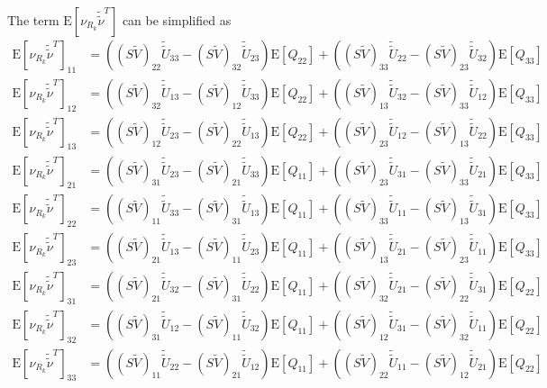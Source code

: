\documentclass[10pt]{article}
\newcommand{\expect}[1]{\ensuremath{\mathrm{E}\left[ #1 \right]}}
\begin{document}
The term $\expect{\nu_{R_k}\tilde{\tilde{\nu}}^T}$ can be simplified as
\begin{align*}
	\expect{\nu_{R_k}\tilde{\tilde{\nu}}^T}_{11} &= ((S\tilde{V})_{22}\tilde{\tilde{U}}_{33} - (S\tilde{V})_{32}\tilde{\tilde{U}}_{23})\expect{Q_{22}} + ((S\tilde{V})_{33}\tilde{\tilde{U}}_{22} - (S\tilde{V})_{23}\tilde{\tilde{U}}_{32})\expect{Q_{33}} \\
	\expect{\nu_{R_k}\tilde{\tilde{\nu}}^T}_{12} &= ((S\tilde{V})_{32}\tilde{\tilde{U}}_{13} - (S\tilde{V})_{12}\tilde{\tilde{U}}_{33})\expect{Q_{22}} + ((S\tilde{V})_{13}\tilde{\tilde{U}}_{32} - (S\tilde{V})_{33}\tilde{\tilde{U}}_{12})\expect{Q_{33}} \\
	\expect{\nu_{R_k}\tilde{\tilde{\nu}}^T}_{13} &= ((S\tilde{V})_{12}\tilde{\tilde{U}}_{23} - (S\tilde{V})_{22}\tilde{\tilde{U}}_{13})\expect{Q_{22}} + ((S\tilde{V})_{23}\tilde{\tilde{U}}_{12} - (S\tilde{V})_{13}\tilde{\tilde{U}}_{22})\expect{Q_{33}} \\
	\expect{\nu_{R_k}\tilde{\tilde{\nu}}^T}_{21} &= ((S\tilde{V})_{31}\tilde{\tilde{U}}_{23} - (S\tilde{V})_{21}\tilde{\tilde{U}}_{33})\expect{Q_{11}} + ((S\tilde{V})_{23}\tilde{\tilde{U}}_{31} - (S\tilde{V})_{33}\tilde{\tilde{U}}_{21})\expect{Q_{33}} \\
	\expect{\nu_{R_k}\tilde{\tilde{\nu}}^T}_{22} &= ((S\tilde{V})_{11}\tilde{\tilde{U}}_{33} - (S\tilde{V})_{31}\tilde{\tilde{U}}_{13})\expect{Q_{11}} + ((S\tilde{V})_{33}\tilde{\tilde{U}}_{11} - (S\tilde{V})_{13}\tilde{\tilde{U}}_{31})\expect{Q_{33}} \\
	\expect{\nu_{R_k}\tilde{\tilde{\nu}}^T}_{23} &= ((S\tilde{V})_{21}\tilde{\tilde{U}}_{13} - (S\tilde{V})_{11}\tilde{\tilde{U}}_{23})\expect{Q_{11}} + ((S\tilde{V})_{13}\tilde{\tilde{U}}_{21} - (S\tilde{V})_{23}\tilde{\tilde{U}}_{11})\expect{Q_{33}} \\
	\expect{\nu_{R_k}\tilde{\tilde{\nu}}^T}_{31} &= ((S\tilde{V})_{21}\tilde{\tilde{U}}_{32} - (S\tilde{V})_{31}\tilde{\tilde{U}}_{22})\expect{Q_{11}} + ((S\tilde{V})_{32}\tilde{\tilde{U}}_{21} - (S\tilde{V})_{22}\tilde{\tilde{U}}_{31})\expect{Q_{22}} \\
	\expect{\nu_{R_k}\tilde{\tilde{\nu}}^T}_{32} &= ((S\tilde{V})_{31}\tilde{\tilde{U}}_{12} - (S\tilde{V})_{11}\tilde{\tilde{U}}_{32})\expect{Q_{11}} + ((S\tilde{V})_{12}\tilde{\tilde{U}}_{31} - (S\tilde{V})_{32}\tilde{\tilde{U}}_{11})\expect{Q_{22}} \\
	\expect{\nu_{R_k}\tilde{\tilde{\nu}}^T}_{33} &= ((S\tilde{V})_{11}\tilde{\tilde{U}}_{22} - (S\tilde{V})_{21}\tilde{\tilde{U}}_{12})\expect{Q_{11}} + ((S\tilde{V})_{22}\tilde{\tilde{U}}_{11} - (S\tilde{V})_{12}\tilde{\tilde{U}}_{21})\expect{Q_{22}} \\
\end{align*}
\end{document}
